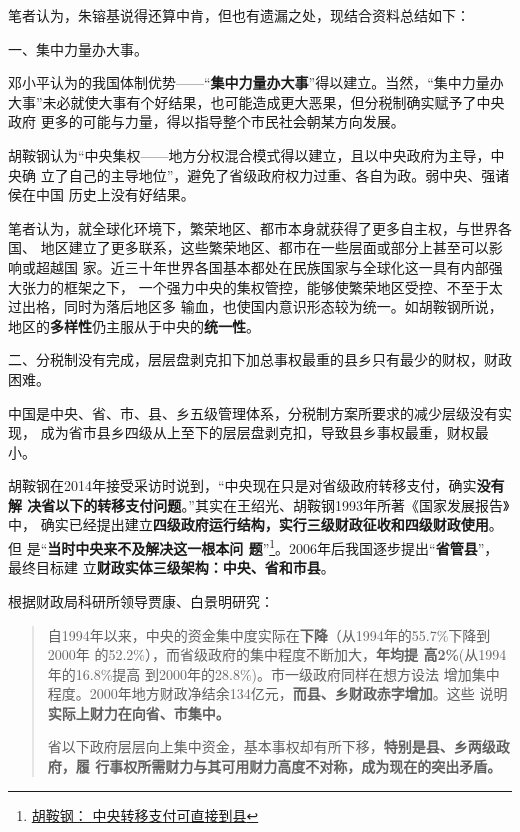 笔者认为，朱镕基说得还算中肯，但也有遗漏之处，现结合资料总结如下：

{\heiti 一、集中力量办大事。}

邓小平认为的我国体制优势——“\textbf{集中力量办大事}”得以建立。当然，“集中力量办
大事”未必就使大事有个好结果，也可能造成更大恶果，但分税制确实赋予了中央政府
更多的可能与力量，得以指导整个市民社会朝某方向发展。

胡鞍钢认为“中央集权——地方分权混合模式得以建立，且以中央政府为主导，中央确
立了自己的主导地位”，避免了省级政府权力过重、各自为政。弱中央、强诸侯在中国
历史上没有好结果。

笔者认为，就全球化环境下，繁荣地区、都市本身就获得了更多自主权，与世界各国、
地区建立了更多联系，这些繁荣地区、都市在一些层面或部分上甚至可以影响或超越国
家。近三十年世界各国基本都处在民族国家与全球化这一具有内部强大张力的框架之下，
一个强力中央的集权管控，能够使繁荣地区受控、不至于太过出格，同时为落后地区多
输血，也使国内意识形态较为统一。如胡鞍钢所说，地区的\textbf{多样性}仍主服从于中央的\textbf{统一性}。

{\heiti 二、分税制没有完成，层层盘剥克扣下加总事权最重的县乡只有最少的财权，财政困难。}

中国是中央、省、市、县、乡五级管理体系，分税制方案所要求的减少层级没有实现，
成为省市县乡四级从上至下的层层盘剥克扣，导致县乡事权最重，财权最小。

胡鞍钢在2014年接受采访时说到，“中央现在只是对省级政府转移支付，确实\textbf{没有解
  决省以下的转移支付问题}。”其实在王绍光、胡鞍钢1993年所著《国家发展报告》中，
确实已经提出建立\textbf{四级政府运行结构，实行三级财政征收和四级财政使用}。但
是“\textbf{当时中央来不及解决这一根本问
  题}”\footnote{\href{http://business.sohu.com/20140428/n398892838.shtml}{胡鞍钢：
    中央转移支付可直接到县}}。2006年后我国逐步提出“\textbf{省管县}”，最终目标建
立\textbf{财政实体三级架构：中央、省和市县}。


根据财政局科研所领导贾康、白景明研究：
\begin{quotation}
  自1994年以来，中央的资金集中度实际在\textbf{下降}（从1994年的55.7\%下降到2000年
  的52.2\%），而省级政府的集中程度不断加大，\textbf{年均提
    高2\%}(从1994年的16.8\%提高 到2000年的28.8\%)。市一级政府同样在想方设法
  增加集中程度。2000年地方财政净结余134亿元，\textbf{而县、乡财政赤字增加}。这些
  说明\textbf{实际上财力在向省、市集中。}\cite{xianxiangfenshui}

  省以下政府层层向上集中资金，基本事权却有所下移，\textbf{特别是县、乡两级政府，履
    行事权所需财力与其可用财力高度不对称，成为现在的突出矛盾。}
\end{quotation}

